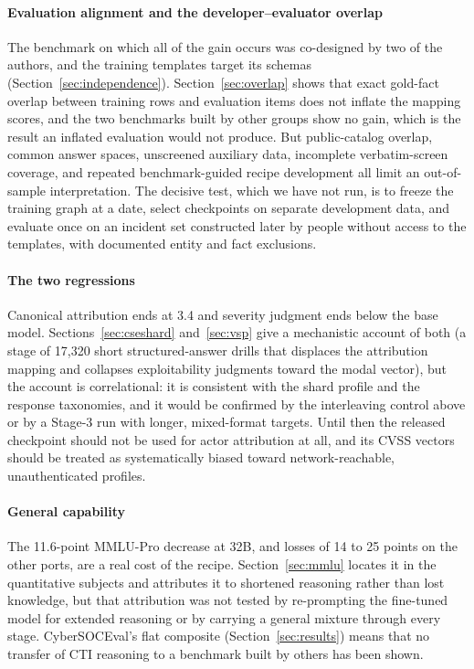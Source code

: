 \documentclass[preprint,12pt,authoryear]{elsarticle}
\begin{document}
\paragraph{Evaluation alignment and the developer--evaluator overlap}
The benchmark on which all of the gain occurs was co-designed by two of the authors, and the training templates target its schemas (Section~\ref{sec:independence}). Section~\ref{sec:overlap} shows that exact gold-fact overlap between training rows and evaluation items does not inflate the mapping scores, and the two benchmarks built by other groups show no gain, which is the result an inflated evaluation would not produce. But public-catalog overlap, common answer spaces, unscreened auxiliary data, incomplete verbatim-screen coverage, and repeated benchmark-guided recipe development all limit an out-of-sample interpretation. The decisive test, which we have not run, is to freeze the training graph at a date, select checkpoints on separate development data, and evaluate once on an incident set constructed later by people without access to the templates, with documented entity and fact exclusions.

\paragraph{The two regressions}
Canonical attribution ends at 3.4 and severity judgment ends below the base model. Sections~\ref{sec:cseshard} and~\ref{sec:vsp} give a mechanistic account of both (a stage of 17,320 short structured-answer drills that displaces the attribution mapping and collapses exploitability judgments toward the modal vector), but the account is correlational: it is consistent with the shard profile and the response taxonomies, and it would be confirmed by the interleaving control above or by a Stage-3 run with longer, mixed-format targets. Until then the released checkpoint should not be used for actor attribution at all, and its CVSS vectors should be treated as systematically biased toward network-reachable, unauthenticated profiles.

\paragraph{General capability}
The 11.6-point MMLU-Pro decrease at 32B, and losses of 14 to 25 points on the other ports, are a real cost of the recipe. Section~\ref{sec:mmlu} locates it in the quantitative subjects and attributes it to shortened reasoning rather than lost knowledge, but that attribution was not tested by re-prompting the fine-tuned model for extended reasoning or by carrying a general mixture through every stage. CyberSOCEval's flat composite (Section~\ref{sec:results}) means that no transfer of CTI reasoning to a benchmark built by others has been shown.
\end{document}
